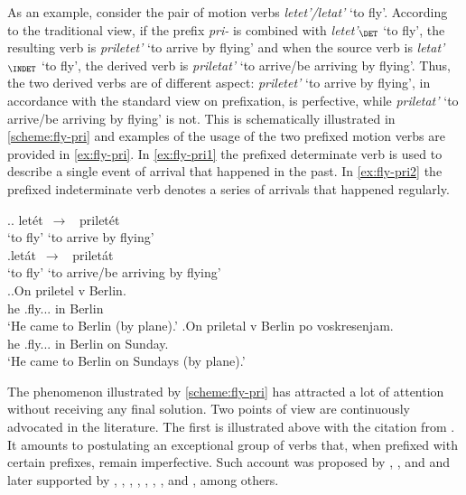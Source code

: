 
As an example, consider the pair of motion verbs \textit{letet'/letat'} `to fly'. According to the traditional view, if the prefix \textit{pri-} is combined with \textit{letet'}$_{\DET}$ `to fly', the resulting verb is \textit{priletet'}\textsuperscript{\PF} `to arrive by flying' and when the source verb is \textit{letat'}$_{\INDET}$ `to fly', the derived verb is \textit{priletat'}\textsuperscript{\IPF} `to arrive/be arriving by flying'. Thus, the two derived verbs are of different aspect: \textit{priletet'} `to arrive by flying', in accordance with the standard view on prefixation, is perfective, while \textit{priletat'} `to arrive/be arriving by flying' is not. This is schematically illustrated in \ref{scheme:fly-pri} and examples of the usage of the two prefixed motion verbs are provided in \ref{ex:fly-pri}. In \ref{ex:fly-pri1} the prefixed determinate verb is used to describe a single event of arrival that happened in the past. In \ref{ex:fly-pri2} the prefixed indeterminate verb denotes a series of arrivals that happened regularly.

\ex.\label{scheme:fly-pri}\ag. let\'{e}t\textsuperscript{\IPF}~$\to$~ prilet\'{e}t\textsuperscript{\PF}\\
{`to fly'} {`to arrive by flying'}\\
\bg.let\'{a}t\textsuperscript{\IPF}~$\to$~ prilet\'{a}t\textsuperscript{\IPF}\\
{`to fly'} {`to arrive/be arriving by flying'}\\

\ex.\label{ex:fly-pri}\ag.\label{ex:fly-pri1}On priletel\textsuperscript{\PF} v Berlin.\\
he .fly... in Berlin\\
\trans `He came to Berlin (by plane).'
\bg.\label{ex:fly-pri2}On priletal\textsuperscript{\IPF} v Berlin po voskresenjam.\\
he .fly... in Berlin on Sunday.\\
\trans `He came to Berlin on Sundays (by plane).'

The phenomenon illustrated by \ref{scheme:fly-pri} has attracted a lot of attention without receiving any final solution. Two points of view are continuously advocated in the literature. The first is illustrated above with the citation from \citet{Titelbaum:90}. It amounts to postulating an exceptional group of verbs that, when prefixed with certain prefixes, remain imperfective. Such account was proposed by \citet[46]{Meillet:1902}, \citet[5]{Mazon:1908}, and \citet{Vondrak:1908} and later supported by \citet{Shaxmatov:41}, \citet{Gvozdev:73}, \citet{Vinogradov:72}, \citet{Townsend:75}, \citet{Shvedova:82}, \citet{Wade:92}, \citet{Nesset:08}, and \citet{Janda:10}, among others. 

